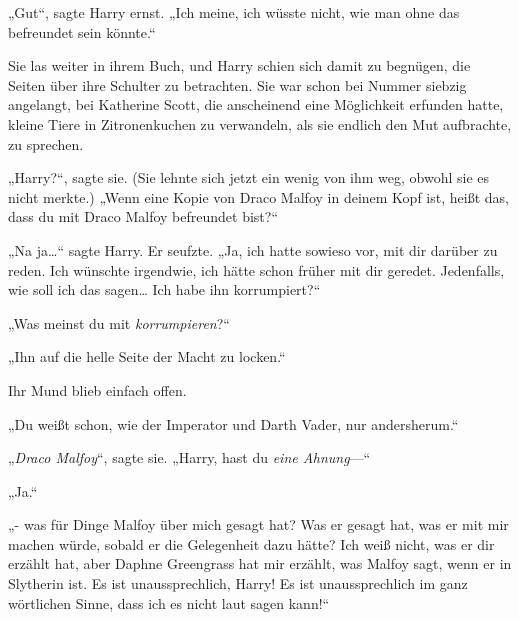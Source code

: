 „Gut“, sagte Harry ernst. „Ich meine, ich wüsste nicht, wie man ohne das befreundet sein könnte.“


Sie las weiter in ihrem Buch, und Harry schien sich damit zu begnügen, die Seiten über ihre Schulter zu betrachten. Sie war schon bei Nummer siebzig angelangt, bei Katherine Scott, die anscheinend eine Möglichkeit erfunden hatte, kleine Tiere in Zitronenkuchen zu verwandeln, als sie endlich den Mut aufbrachte, zu sprechen.

„Harry?“, sagte sie. (Sie lehnte sich jetzt ein wenig von ihm weg, obwohl sie es nicht merkte.) „Wenn eine Kopie von Draco Malfoy in deinem Kopf ist, heißt das, dass du mit Draco Malfoy befreundet bist?“

„Na ja…“ sagte Harry. Er seufzte. „Ja, ich hatte sowieso vor, mit dir darüber zu reden. Ich wünschte irgendwie, ich hätte schon früher mit dir geredet. Jedenfalls, wie soll ich das sagen… Ich habe ihn korrumpiert?“

„Was meinst du mit \emph{korrumpieren}?“

„Ihn auf die helle Seite der Macht zu locken.“

Ihr Mund blieb einfach offen.

„Du weißt schon, wie der Imperator und Darth Vader, nur andersherum.“

„\emph{Draco Malfoy}“, sagte sie. „Harry, hast du \emph{eine Ahnung}—“

„Ja.“

„- was für Dinge Malfoy über mich gesagt hat? Was er gesagt hat, was er mit mir machen würde, sobald er die Gelegenheit dazu hätte? Ich weiß nicht, was er dir erzählt hat, aber Daphne Greengrass hat mir erzählt, was Malfoy sagt, wenn er in Slytherin ist. Es ist unaussprechlich, Harry! Es ist unaussprechlich im ganz wörtlichen Sinne, dass ich es nicht laut sagen kann!“

